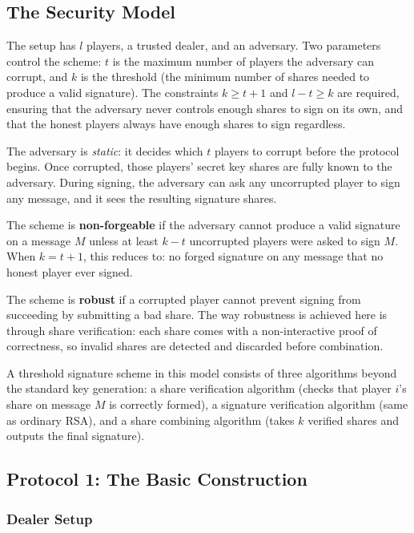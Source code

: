 \subsection{The Security Model}

The setup has $l$ players, a trusted dealer, and an adversary. Two parameters control the
scheme: $t$ is the maximum number of players the adversary can corrupt, and $k$ is the
threshold (the minimum number of shares needed to produce a valid signature). The
constraints $k \geq t + 1$ and $l - t \geq k$ are required, ensuring that the adversary
never controls enough shares to sign on its own, and that the honest players always have
enough shares to sign regardless.

The adversary is \emph{static}: it decides which $t$ players to corrupt before the
protocol begins. Once corrupted, those players' secret key shares are fully known to the
adversary. During signing, the adversary can ask any uncorrupted player to sign any
message, and it sees the resulting signature shares.

The scheme is \textbf{non-forgeable} if the adversary cannot produce a valid signature on
a message $M$ unless at least $k - t$ uncorrupted players were asked to sign $M$. When
$k = t + 1$, this reduces to: no forged signature on any message that no honest player
ever signed.

The scheme is \textbf{robust} if a corrupted player cannot prevent signing from
succeeding by submitting a bad share. The way robustness is achieved here is through
share verification: each share comes with a non-interactive proof of correctness, so
invalid shares are detected and discarded before combination.

A threshold signature scheme in this model consists of three algorithms beyond the
standard key generation: a share verification algorithm (checks that player $i$'s share
on message $M$ is correctly formed), a signature verification algorithm (same as ordinary
RSA), and a share combining algorithm (takes $k$ verified shares and outputs the final
signature).

\subsection{Protocol 1: The Basic Construction}

\subsubsection{Dealer Setup}

